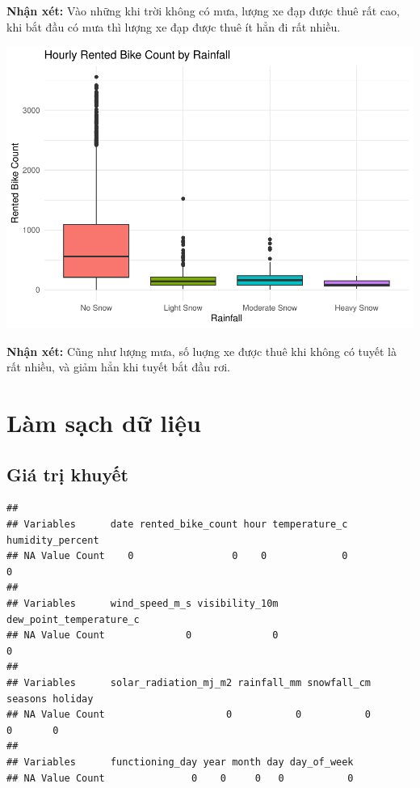 \documentclass[
  11pt,
  letterpaper,
]{article}
\begin{document}
\textbf{Nhận xét:} Vào những khi trời không có mưa, lượng xe đạp được thuê rất cao, khi bắt đầu có mưa thì lượng xe đạp được thuê ít hẳn đi rất nhiều.

\begin{center}\includegraphics[width=1.2\linewidth,]{Final_Project_files/figure-latex/unnamed-chunk-9-1} \end{center}

\textbf{Nhận xét:} Cũng như lượng mưa, số luợng xe được thuê khi không có tuyết là rất nhiều, và giảm hẳn khi tuyết bắt đầu rơi.
\newpage

\section{Làm sạch dữ liệu}
\subsection{Giá trị khuyết}

\begin{verbatim}
##                                                                          
## Variables      date rented_bike_count hour temperature_c humidity_percent
## NA Value Count    0                 0    0             0                0
##                                                                     
## Variables      wind_speed_m_s visibility_10m dew_point_temperature_c
## NA Value Count              0              0                       0
##                                                                             
## Variables      solar_radiation_mj_m2 rainfall_mm snowfall_cm seasons holiday
## NA Value Count                     0           0           0       0       0
##                                                          
## Variables      functioning_day year month day day_of_week
## NA Value Count               0    0     0   0           0
\end{verbatim}
\end{document}
